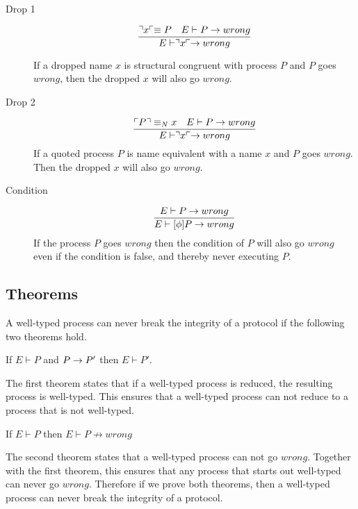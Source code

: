 \begin{description}
    \item[Drop 1]\begin{align*}
        \frac{\urcorner x \ulcorner \equiv P \quad E \vdash P \rightarrow wrong}{E \vdash \urcorner x \ulcorner \rightarrow wrong}
    \end{align*}
    
    If a dropped name $x$ is structural congruent with process $P$ and $P$ goes $wrong$, then the dropped $x$ will also go $wrong$.\\

    \item[Drop 2]\begin{align*}
        \frac{\ulcorner P \urcorner \equiv _N x \quad E \vdash P \rightarrow wrong}{E \vdash \urcorner x \ulcorner \rightarrow wrong}
    \end{align*}
    If a quoted process $P$ is name equivalent with a name $x$ and $P$ goes $wrong$. Then the dropped $x$ will also go $wrong$.\\

    \item[Condition]\begin{align*}
        \frac{E \vdash P \rightarrow wrong}{E \vdash [\phi]P \rightarrow wrong}
    \end{align*}
    If the process $P$ goes $wrong$ then the condition of $P$ will also go $wrong$ even if the condition is false, and thereby never executing $P$.
\end{description}

\subsection{Theorems}
A well-typed process can never break the integrity of a protocol if the following two theorems hold.

\begin{theorem}
	If $E \vdash P$ and $P\rightarrow P'$ then $E \vdash P'$.
\end{theorem}

The first theorem states that if a well-typed process is reduced, the resulting process is well-typed. This ensures that a well-typed process can not reduce to a process that is not well-typed.

\begin{theorem}
	If $E \vdash P$ then $E \vdash P \nrightarrow wrong$
\end{theorem}

The second theorem states that a well-typed process can not go $wrong$. Together with the first theorem, this ensures that any process that starts out well-typed can never go $wrong$. Therefore if we prove both theorems, then a well-typed process can never break the integrity of a protocol.
